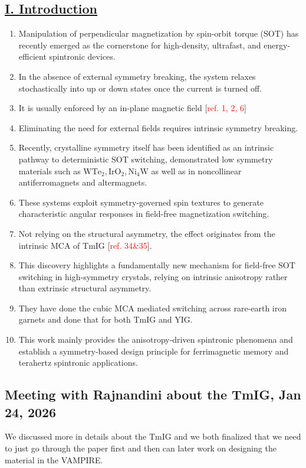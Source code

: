 \subsection*{\centering\underline{I. Introduction}}
\begin{enumerate}
    \item Manipulation of perpendicular magnetization by spin-orbit torque (SOT) has recently emerged as the cornerstone for high-density, ultrafast, and energy-efficient spintronic devices.
    \item In the absence of external symmetry breaking, the system relaxes stochastically into up or down states once the current is turned off.
    \item It is usually enforced by an in-plane magnetic field [\textcolor{red}{ref. 1, 2, 6}]
    \item Eliminating the need for external fields requires intrinsic symmetry breaking.
    \item Recently, crystalline symmetry itself has been identified as an intrinsic pathway to deterministic SOT switching, demonstrated low symmetry materials such as $\mathrm{WTe_2, IrO_2, Ni_4W}$ as well as in  noncollinear antiferromagnets and altermagnets.
    \item These systems exploit symmetry-governed spin textures to generate characteristic angular responses in field-free magnetization switching.
    \item Not relying on the structural asymmetry, the effect originates from the intrinsic MCA of TmIG [\textcolor{red}{ref. 34\&35}].
    \item This discovery highlights a fundamentally new mechanism for field-free SOT switching in high-symmetry crystals, relying on intrinsic anisotropy rather than extrinsic structural asymmetry.
    \item They have done the cubic MCA mediated switching across rare-earth iron garnets and done that for both TmIG and YIG.
    \item This work mainly provides the anisotropy-driven spintronic phenomena and establish a symmetry-based design principle for ferrimagnetic memory and terahertz spintronic applications.
\end{enumerate}
\subsection*{Meeting with Rajnandini about the TmIG, Jan 24, 2026}
We discussed more in details about the TmIG and we both finalized that we need to just go through the paper first and then can later work on designing the material in the VAMPIRE. 

